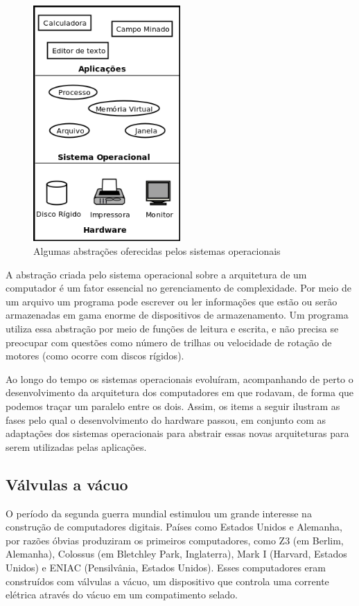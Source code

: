 \documentclass[11pt,twoside,a4paper]{book}
\begin{document}
\begin{figure}
  \centering
  \includegraphics[width=0.5\textwidth]{abstracoes_so} 
  \caption{Algumas abstrações oferecidas pelos sistemas operacionais}
  \label{fig:abstracoes_so} 
\end{figure}

A abstração criada pelo sistema operacional sobre a arquitetura de um computador é um fator essencial no gerenciamento de complexidade. Por meio de um arquivo um programa pode escrever ou ler informações que estão ou serão armazenadas em gama enorme de dispositivos de armazenamento. Um programa utiliza essa abstração por meio de funções de leitura e escrita, e não precisa se preocupar com questões como número de trilhas ou velocidade de rotação de motores (como ocorre com discos rígidos).

Ao longo do tempo os sistemas operacionais evoluíram, acompanhando de perto o desenvolvimento da arquitetura dos computadores em que rodavam, de forma que podemos traçar um paralelo entre os dois. Assim, os items a seguir ilustram as fases pelo qual o desenvolvimento do hardware passou, em conjunto com as adaptações dos sistemas operacionais para abstrair essas novas arquiteturas para serem utilizadas pelas aplicações.

\subsection*{Válvulas a vácuo}
 O período da segunda guerra mundial estimulou um grande interesse na construção de computadores digitais. Países como Estados Unidos e Alemanha, por razões óbvias produziram os primeiros computadores, como Z3 (em Berlim, Alemanha), Colossus (em Bletchley Park, Inglaterra), Mark I (Harvard, Estados Unidos) e ENIAC (Pensilvânia, Estados Unidos). Esses computadores eram construídos com válvulas a vácuo, um dispositivo que controla uma corrente elétrica através do vácuo em um compatimento selado.
\end{document}
